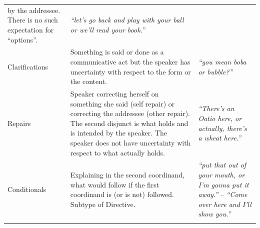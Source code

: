 \documentclass[oneside]{report}
\theoremstyle{definition}
\theoremstyle{definition}
\theoremstyle{definition}
\theoremstyle{remark}
\begin{document}
\begin{longtable}[]{@{}lll@{}}
\begin{minipage}[t]{0.44\columnwidth}
by the addressee. There is no such expectation for ``options''.\strut
\end{minipage} & \begin{minipage}[t]{0.33\columnwidth}\raggedright\strut
\emph{``let's go back and play with your ball or we'll read your
book.''}\strut
\end{minipage}\tabularnewline
\begin{minipage}[t]{0.14\columnwidth}\raggedright\strut
Clarifications\strut
\end{minipage} & \begin{minipage}[t]{0.44\columnwidth}\raggedright\strut
Something is said or done as a communicative act but the speaker has
uncertainty with respect to the form or the content.\strut
\end{minipage} & \begin{minipage}[t]{0.33\columnwidth}\raggedright\strut
\emph{``you mean boba or bubble?''}\strut
\end{minipage}\tabularnewline
\begin{minipage}[t]{0.14\columnwidth}\raggedright\strut
Repairs\strut
\end{minipage} & \begin{minipage}[t]{0.44\columnwidth}\raggedright\strut
Speaker correcting herself on something she said (self repair) or
correcting the addressee (other repair). The second disjunct is what
holds and is intended by the speaker. The speaker does not have
uncertainty with respect to what actually holds.\strut
\end{minipage} & \begin{minipage}[t]{0.33\columnwidth}\raggedright\strut
\emph{``There's an Oatio here, or actually, there's a wheat
here.''}\strut
\end{minipage}\tabularnewline
\begin{minipage}[t]{0.14\columnwidth}\raggedright\strut
Conditionals\strut
\end{minipage} & \begin{minipage}[t]{0.44\columnwidth}\raggedright\strut
Explaining in the second coordinand, what would follow if the first
coordinand is (or is not) followed. Subtype of Directive.\strut
\end{minipage} & \begin{minipage}[t]{0.33\columnwidth}\raggedright\strut
\emph{``put that out of your mouth, or I'm gonna put it away.''} --
\emph{``Come over here and I'll show you.''}\strut
\end{minipage}\tabularnewline
\begin{minipage}[t]{0.14\columnwidth}\raggedright\strut

\end{minipage}
\end{longtable}
\end{document}
